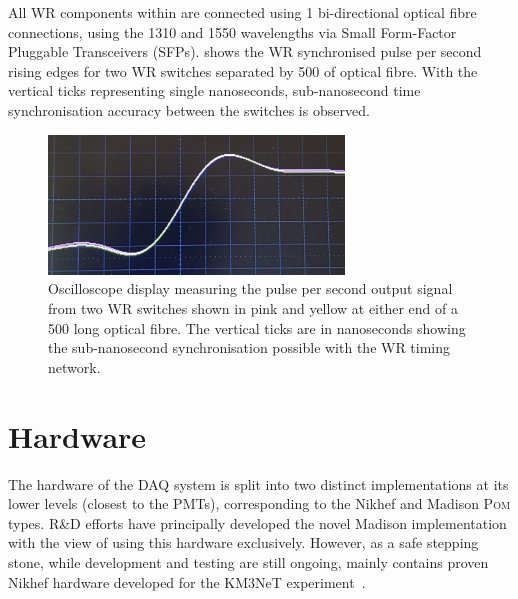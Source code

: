 All WR components within \chipsfive are connected using \SI{1}{} bi-directional optical
fibre connections, using the \SI{1310}{} and \SI{1550}{} wavelengths via Small
Form-Factor Pluggable Transceivers (SFPs).  shows the WR synchronised pulse
per second rising edges for two \chipsfive WR switches separated by \SI{500}{} of optical
fibre. With the vertical ticks representing single nanoseconds, sub-nanosecond time
synchronisation accuracy between the switches is observed.

\begin{figure} %
    \includegraphics[width=0.7\textwidth]{diagrams/5-daq/sync.pdf}
    \caption[Picture of White Rabbit timing synchronisation seen within \chipsfive]
    {Oscilloscope display measuring the pulse per second output signal from two WR switches shown
        in pink and yellow at either end of a \SI{500}{} long optical fibre. The vertical
        ticks are in nanoseconds showing the sub-nanosecond synchronisation possible with the WR
        timing network.}
    \label{fig:sync}
\end{figure}

\section{Hardware} %
\label{sec:daq_hard} %

The hardware of the \chipsfive DAQ system is split into two distinct implementations at its lower
levels (closest to the PMTs), corresponding to the Nikhef and Madison \textsc{Pom} types. \chips
R\&D efforts have principally developed the novel Madison implementation with the view of using
this hardware exclusively. However, as a safe stepping stone, while development and testing are
still ongoing, \chipsfive mainly contains proven Nikhef hardware developed for the KM3NeT
experiment~\cite{adrian2016}.

